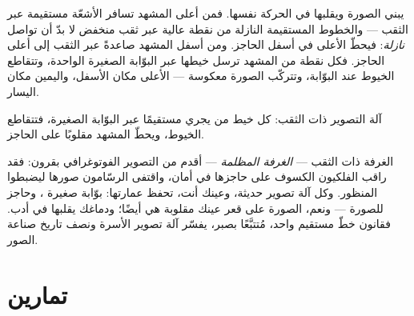 \begin{proposition}\label{prop:g6:light-propagation:inverted}
 يبني الصورة ويقلبها في الحركة نفسها. فمن أعلى
المشهد تسافر الأشعّة مستقيمة عبر الثقب --- والخطوط المستقيمة
النازلة من نقطة عالية عبر ثقب منخفض لا بدّ أن تواصل
\emph{نازلة}: فيحطّ الأعلى في أسفل الحاجز. ومن أسفل المشهد صاعدةً
عبر الثقب إلى أعلى الحاجز. فكل نقطة من المشهد ترسل خيطها عبر
البوّابة الصغيرة الواحدة، وتتقاطع الخيوط عند البوّابة، وتتركّب
الصورة معكوسة --- الأعلى مكان الأسفل، واليمين مكان اليسار.
\end{proposition}

\begin{omfigure}

{\small آلة التصوير ذات الثقب: كل خيط من  يجري مستقيمًا عبر
البوّابة الصغيرة، فتتقاطع الخيوط، ويحطّ المشهد مقلوبًا على
الحاجز.}
\end{omfigure}

\begin{remark}\label{rem:g6:light-propagation:history}
الغرفة ذات الثقب --- \emph{الغرفة المظلمة} --- أقدم من التصوير
الفوتوغرافي بقرون: فقد راقب الفلكيون الكسوف على حاجزها في أمان،
واقتفى الرسّامون صورها ليضبطوا المنظور. وكل آلة تصوير حديثة،
وعينك أنت، تحفظ عمارتها: بوّابة صغيرة ، وحاجز للصورة ---
ونعم، الصورة على قعر عينك مقلوبة هي أيضًا؛ ودماغك يقلبها في
أدب. فقانون خطّ مستقيم واحد، مُتتبَّعًا بصبر، يفسّر آلة تصوير
الأسرة ونصف تاريخ صناعة الصور.
\end{remark}

\section{تمارين}

